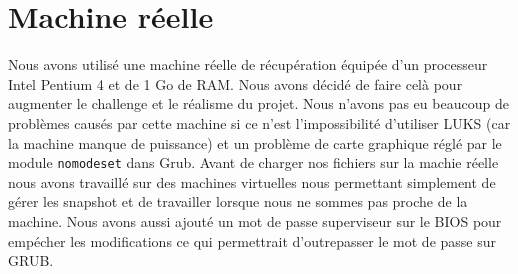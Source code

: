 \section{Machine réelle}
Nous avons utilisé une machine réelle de récupération équipée d'un processeur Intel Pentium 4 et de 1 Go de RAM. Nous avons décidé de faire celà pour augmenter le challenge et le réalisme du projet. Nous n'avons pas eu beaucoup de problèmes causés par cette machine si ce n'est l'impossibilité d'utiliser LUKS (car la machine manque de puissance) et un problème de carte graphique réglé par le module \texttt{nomodeset} dans Grub.
Avant de charger nos fichiers sur la machie réelle nous avons travaillé sur des machines virtuelles nous permettant simplement de gérer les snapshot et de travailler lorsque nous ne sommes pas proche de la machine.
Nous avons aussi ajouté un mot de passe superviseur sur le BIOS pour empécher les modifications ce qui permettrait d'outrepasser le mot de passe sur GRUB.
